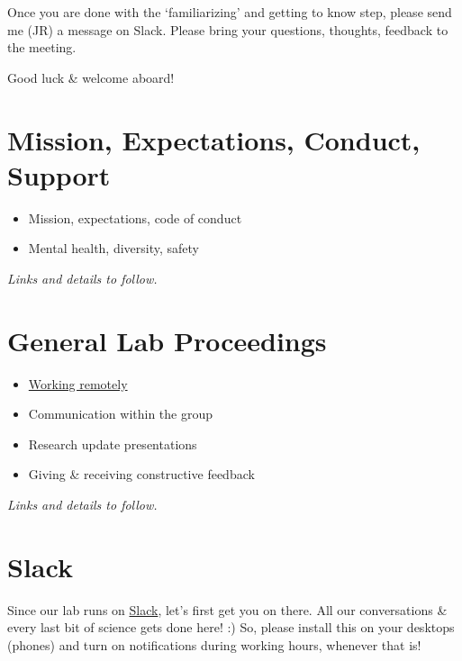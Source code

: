 \documentclass[
  letterpaper,
  DIV=11,
  numbers=noendperiod]{scrreprt}
\providecommand{\tightlist}{%
  \setlength{\itemsep}{0pt}\setlength{\parskip}{0pt}}\usepackage{longtable,booktabs,array}
\begin{document}
Once you are done with the `familiarizing' and getting to know step,
please send me (JR) a message on Slack. Please bring your questions,
thoughts, feedback to the meeting.

Good luck \& welcome aboard! 🎉


\hypertarget{mission-expectations-conduct-support}{%
\chapter{Mission, Expectations, Conduct,
Support}\label{mission-expectations-conduct-support}}

\begin{itemize}
\tightlist
\item
  Mission, expectations, code of conduct
\item
  Mental health, diversity, safety
\end{itemize}

\emph{Links and details to follow.}


\hypertarget{general-lab-proceedings}{%
\chapter{General Lab Proceedings}\label{general-lab-proceedings}}

\begin{itemize}
\tightlist
\item
  \href{https://github.com/JRaviLab/group/blob/master/docs/howto_work_remotely.md}{Working
  remotely}
\item
  Communication within the group
\item
  Research update presentations
\item
  Giving \& receiving constructive feedback
\end{itemize}

\emph{Links and details to follow.}


\hypertarget{slack}{%
\chapter{Slack}\label{slack}}

Since our lab runs on \href{https://jravilab.slack.com}{Slack}, let's
first get you on there. All our conversations \& every last bit of
science gets done here! :) So, please install this on your desktops
(phones) and turn on notifications during working hours, whenever that
is!
\end{document}
